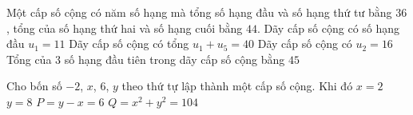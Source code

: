 \begin{ex}%
	Một cấp  số cộng có năm số hạng mà tổng số hạng đầu và số hạng thứ tư bằng $36$, tổng của số hạng thứ hai và số hạng cuối bằng $44$.
	\choiceTF 
		{Dãy cấp số cộng có số hạng đầu  $u_1=11$}
		{\True Dãy cấp số cộng  có tổng $u_1+u_5=40$}
		{\True Dãy cấp số cộng có  $u_2=16$}
		{Tổng của $3$ số hạng đầu  tiên trong dãy cấp số cộng bằng $45$}
\end{ex}

\begin{ex}%
	Cho bốn số $-2$, $x$, $6$, $y$ theo  thứ tự lập thành một cấp số cộng. Khi đó
	 \choiceTF
		{\True  $x=2$}
		 {$y=8$}
		{$P=y-x=6$} 
		{\True $Q=x^2+y^2=104$} 
\end{ex}

